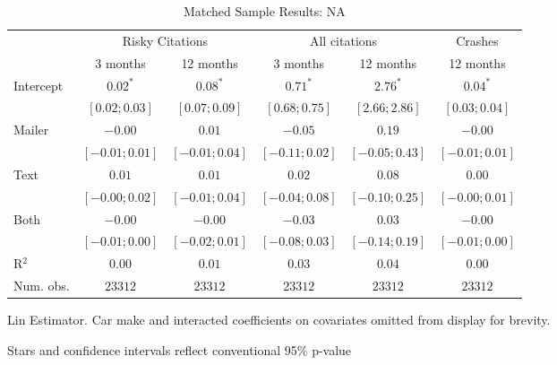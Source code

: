 
\begin{table}
\caption{Matched Sample Results: NA}
\begin{center}
\begin{threeparttable}
\begin{tabular}{l c c c c c}
\hline
 & \multicolumn{2}{c}{Risky Citations} & \multicolumn{2}{c}{All citations} & \multicolumn{1}{c}{Crashes} \\
\cline{2-3} \cline{4-5} \cline{6-6}
 & 3 months & 12 months & 3 months & 12 months & 12 months \\
\hline
Intercept & $0.02^{*}$       & $0.08^{*}$       & $0.71^{*}$       & $2.76^{*}$       & $0.04^{*}$       \\
          & $ [ 0.02; 0.03]$ & $ [ 0.07; 0.09]$ & $ [ 0.68; 0.75]$ & $ [ 2.66; 2.86]$ & $ [ 0.03; 0.04]$ \\
Mailer    & $-0.00$          & $0.01$           & $-0.05$          & $0.19$           & $-0.00$          \\
          & $ [-0.01; 0.01]$ & $ [-0.01; 0.04]$ & $ [-0.11; 0.02]$ & $ [-0.05; 0.43]$ & $ [-0.01; 0.01]$ \\
Text      & $0.01$           & $0.01$           & $0.02$           & $0.08$           & $0.00$           \\
          & $ [-0.00; 0.02]$ & $ [-0.01; 0.04]$ & $ [-0.04; 0.08]$ & $ [-0.10; 0.25]$ & $ [-0.00; 0.01]$ \\
Both      & $-0.00$          & $-0.00$          & $-0.03$          & $0.03$           & $-0.00$          \\
          & $ [-0.01; 0.00]$ & $ [-0.02; 0.01]$ & $ [-0.08; 0.03]$ & $ [-0.14; 0.19]$ & $ [-0.01; 0.00]$ \\
\hline
R$^2$     & $0.00$           & $0.01$           & $0.03$           & $0.04$           & $0.00$           \\
Num. obs. & $23312$          & $23312$          & $23312$          & $23312$          & $23312$          \\
\hline
\end{tabular}
\begin{tablenotes}[flushleft]
\scriptsize{\item Lin Estimator. Car make and interacted coefficients on covariates omitted from display for brevity.
                             \item Stars and confidence intervals reflect conventional 95\% p-value}
\end{tablenotes}
\end{threeparttable}
\label{table:coefficients}
\end{center}
\end{table}
